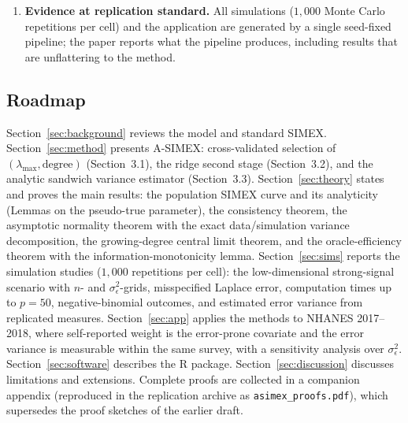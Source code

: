 \begin{enumerate}
      covariates beats the oracle to first order) and an explicit
      second-order expansion whose sign is design-dependent. Along the
      way we correct three claims that circulate informally for SIMEX:
      the exactness of the extrapolation target, the form of the
      variance decomposition, and the sign of the second-order
      efficiency loss.
\item \textbf{Evidence at replication standard.} All simulations
      ($1{,}000$ Monte Carlo repetitions per cell) and the application
      are generated by a single seed-fixed pipeline; the paper reports
      what the pipeline produces, including results that are
      unflattering to the method.
\end{enumerate}

\subsection{Roadmap}\label{sec:roadmap}

Section~\ref{sec:background} reviews the model and standard SIMEX.
Section~\ref{sec:method} presents A-SIMEX: cross-validated selection of
$(\lambda_{\max},\text{degree})$ (Section~3.1), the ridge second stage
(Section~3.2), and the analytic sandwich variance estimator
(Section~3.3). Section~\ref{sec:theory} states and proves the main
results: the population SIMEX curve and its analyticity (Lemmas on the
pseudo-true parameter), the consistency theorem, the asymptotic
normality theorem with the exact data/simulation variance
decomposition, the growing-degree central limit theorem, and the
oracle-efficiency theorem with the information-monotonicity lemma.
Section~\ref{sec:sims} reports the simulation studies
($1{,}000$ repetitions per cell): the low-dimensional strong-signal
scenario with $n$- and $\sigma^2_\epsilon$-grids, misspecified Laplace
error, computation times up to $p=50$, negative-binomial outcomes, and
estimated error variance from replicated measures. Section~\ref{sec:app}
applies the methods to NHANES 2017--2018, where self-reported weight is
the error-prone covariate and the error variance is measurable within
the same survey, with a sensitivity analysis over
$\sigma^2_\epsilon$. Section~\ref{sec:software} describes the R
package. Section~\ref{sec:discussion} discusses limitations and
extensions. Complete proofs are collected in a companion appendix
(reproduced in the replication archive as
\texttt{asimex\_proofs.pdf}), which supersedes the proof sketches of
the earlier draft.

